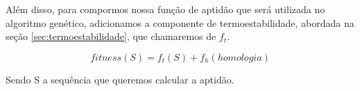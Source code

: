 \documentclass[12pt]{extarticle}
\begin{document}
Além disso, para compormos nossa função de aptidão que será utilizada no
algoritmo genético, adicionamos a componente de termoestabilidade, abordada na
seção \ref{sec:termoestabilidade}, que chamaremos de $f_t$.

\begin{equation}
    fitness(S) = f_t(S) + f_h(homologia)
\end{equation}

Sendo S a sequência que queremos calcular a aptidão.
\end{document}
